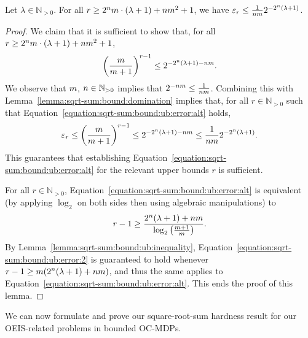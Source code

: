 \documentclass[a4paper,UKenglish,cleveref,autoref,thm-restate,colorlinks]{lipics-v2021}
\newcommand{\IN}{\mathbb{N}}
\newcommand{\INpos}{\IN_{>0}}
\newcommand{\counterUB}{r}
\newcommand{\eleError}[1]{\varepsilon_{#1}}
\begin{document}
\begin{lemma}\label{lemma:sqrt-sum:bound:ub:error}
  Let $\lambda\in\INpos$.
  For all $\counterUB \geq 2^\sqsn\sqsm\cdot(\lambda+1)+\sqsn\sqsm^2+1$, we have $\eleError{\counterUB}\leq \frac{1}{\sqsn\sqsm}2^{-2^\sqsn(\lambda+1)}$.
\end{lemma}
\begin{proof}
  We claim that it is sufficient to show that, for all $\counterUB \geq 2^\sqsn\sqsm\cdot(\lambda+1)+\sqsn\sqsm^2+1$,
  \begin{equation}\label{equation:sqrt-sum:bound:ub:error:alt}
    \left(\frac{\sqsm}{\sqsm+1}\right)^{\counterUB-1}\leq
    2^{-2^\sqsn(\lambda+1)-\sqsn\sqsm}.
  \end{equation}
  We observe that $m$, $\sqsn\in\INpos$ implies that $ 2^{-nm}\leq\frac{1}{nm}$.
  Combining this with Lemma~\ref{lemma:sqrt-sum:bound:domination} implies that, for all $\counterUB\in\INpos$ such that Equation~\eqref{equation:sqrt-sum:bound:ub:error:alt} holds,
  \[\eleError{\counterUB} \leq
    \left(\frac{\sqsm}{\sqsm+1}\right)^{\counterUB-1}\leq
    2^{-2^\sqsn(\lambda+1)-\sqsn\sqsm}\leq
    \frac{1}{\sqsn\sqsm}2^{-2^\sqsn(\lambda+1)}.\]
  This guarantees that establishing Equation~\eqref{equation:sqrt-sum:bound:ub:error:alt} for the relevant upper bounds $\counterUB$ is sufficient.

  For all $\counterUB\in\INpos$, Equation~\eqref{equation:sqrt-sum:bound:ub:error:alt} is equivalent  (by applying $\log_2$ on both sides then using algebraic manipulations) to
    \begin{equation}\label{equation:sqrt-sum:bound:ub:error:2}
      \counterUB-1\geq \frac{2^\sqsn(\lambda+1)+\sqsn\sqsm}{\log_2\left(\frac{\sqsm+1}{\sqsm}\right)}.
    \end{equation}
    By Lemma~\ref{lemma:sqrt-sum:bound:ub:inequality}, Equation~\eqref{equation:sqrt-sum:bound:ub:error:2} is guaranteed to hold whenever $\counterUB-1\geq\sqsm(2^\sqsn(\lambda+1)+\sqsn\sqsm)$, and thus the same applies to Equation~\eqref{equation:sqrt-sum:bound:ub:error:alt}.
    This ends the proof of this lemma.
\end{proof}

We can now formulate and prove our square-root-sum hardness result for our OEIS-related problems in bounded OC-MDPs.
\end{document}
